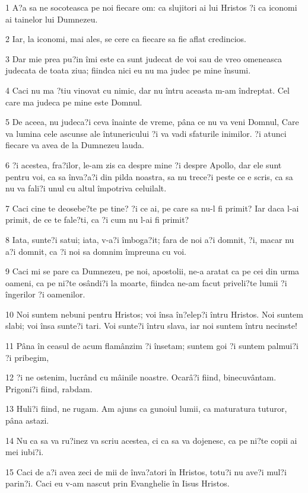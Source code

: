 \par 1 A?a sa ne socoteasca pe noi fiecare om: ca slujitori ai lui Hristos ?i ca iconomi ai tainelor lui Dumnezeu.
\par 2 Iar, la iconomi, mai ales, se cere ca fiecare sa fie aflat credincios.
\par 3 Dar mie prea pu?in îmi este ca sunt judecat de voi sau de vreo omeneasca judecata de toata ziua; fiindca nici eu nu ma judec pe mine însumi.
\par 4 Caci nu ma ?tiu vinovat cu nimic, dar nu întru aceasta m-am îndreptat. Cel care ma judeca pe mine este Domnul.
\par 5 De aceea, nu judeca?i ceva înainte de vreme, pâna ce nu va veni Domnul, Care va lumina cele ascunse ale întunericului ?i va vadi sfaturile inimilor. ?i atunci fiecare va avea de la Dumnezeu lauda.
\par 6 ?i acestea, fra?ilor, le-am zis ca despre mine ?i despre Apollo, dar ele sunt pentru voi, ca sa înva?a?i din pilda noastra, sa nu trece?i peste ce e scris, ca sa nu va fali?i unul cu altul împotriva celuilalt.
\par 7 Caci cine te deosebe?te pe tine? ?i ce ai, pe care sa nu-l fi primit? Iar daca l-ai primit, de ce te fale?ti, ca ?i cum nu l-ai fi primit?
\par 8 Iata, sunte?i satui; iata, v-a?i îmboga?it; fara de noi a?i domnit, ?i, macar nu a?i domnit, ca ?i noi sa domnim împreuna cu voi.
\par 9 Caci mi se pare ca Dumnezeu, pe noi, apostolii, ne-a aratat ca pe cei din urma oameni, ca pe ni?te osândi?i la moarte, fiindca ne-am facut priveli?te lumii ?i îngerilor ?i oamenilor.
\par 10 Noi suntem nebuni pentru Hristos; voi însa în?elep?i întru Hristos. Noi suntem slabi; voi însa sunte?i tari. Voi sunte?i întru slava, iar noi suntem întru necinste!
\par 11 Pâna în ceasul de acum flamânzim ?i însetam; suntem goi ?i suntem palmui?i ?i pribegim,
\par 12 ?i ne ostenim, lucrând cu mâinile noastre. Ocarâ?i fiind, binecuvântam. Prigoni?i fiind, rabdam.
\par 13 Huli?i fiind, ne rugam. Am ajuns ca gunoiul lumii, ca maturatura tuturor, pâna astazi.
\par 14 Nu ca sa va ru?inez va scriu acestea, ci ca sa va dojenesc, ca pe ni?te copii ai mei iubi?i.
\par 15 Caci de a?i avea zeci de mii de înva?atori în Hristos, totu?i nu ave?i mul?i parin?i. Caci eu v-am nascut prin Evanghelie în Iisus Hristos.
